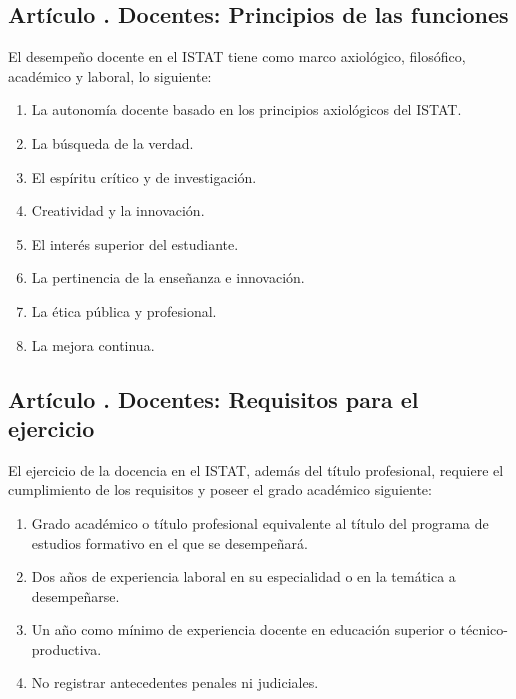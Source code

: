\subsection{Artículo . Docentes: Principios de las funciones}
\addtocounter{ns}{1}
El desempeño docente en el ISTAT tiene como marco axiológico, filosófico, académico y laboral, lo siguiente: 
\begin{enumerate}
\item La autonomía docente basado en los principios axiológicos del ISTAT. 
\item La búsqueda de la verdad. 
\item El espíritu crítico y de investigación. 
\item Creatividad y la innovación. 
\item El interés superior del estudiante. 
\item La pertinencia de la enseñanza e innovación. 
\item La ética pública y profesional. 
\item La mejora continua. 
\end{enumerate}
\subsection{Artículo . Docentes: Requisitos para el ejercicio}
\addtocounter{ns}{1}
El ejercicio de la docencia en el ISTAT, además del título profesional, requiere el cumplimiento de los requisitos y poseer el grado académico siguiente:  
\begin{enumerate}
\item Grado académico o título profesional equivalente al título del programa de estudios formativo en el que se desempeñará.
\item Dos años de experiencia laboral en su especialidad o en la temática a desempeñarse. 
\item Un año como mínimo de experiencia docente en educación superior o técnico-productiva. 
\item No registrar antecedentes penales ni judiciales. 
\end{enumerate}
